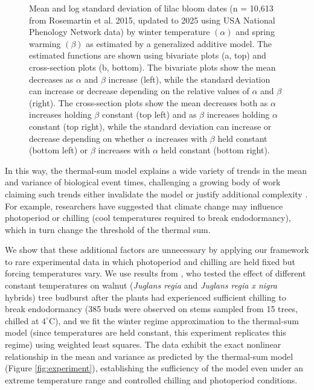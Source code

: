 \documentclass[
]{article}
\begin{document}
{\begin{figure}
     \caption{Mean and log standard deviation of lilac bloom dates (n = 10,613 from Rosemartin et al. 2015, updated to 2025 using USA National Phenology Network data) by winter temperature $(\alpha)$ and spring warming $(\beta)$ as estimated by a generalized additive model. The estimated functions are shown using bivariate plots (a, top) and cross-section plots (b, bottom). The bivariate plots show the mean decreases as $\alpha$ and $\beta$ increase (left), while the standard deviation can increase or decrease depending on the relative values of $\alpha$ and $\beta$ (right). The cross-section plots show the mean decreases both as \(\alpha\) increases holding \(\beta\) constant (top left) and as \(\beta\) increases holding \(\alpha\) constant (top right), while the standard deviation can increase or decrease depending on whether \(\alpha\) increases with \(\beta\) held constant (bottom left) or \(\beta\) increases with \(\alpha\) held constant (bottom right).}
    \label{fig:lilac_te}
\end{figure}
 
In this way, the thermal-sum model explains a wide variety of trends in the mean and variance of biological event times, challenging a growing body of work claiming such trends either invalidate the model or justify additional complexity \citep[e.g.,][]{fu2015declining,kovaleskipreprint}. For example, researchers have suggested that climate change may influence photoperiod or chilling (cool temperatures required to break endodormancy), which in turn change the threshold of the thermal sum. 

We show that these additional factors are unnecessary by applying our framework to rare experimental data in which photoperiod and chilling are held fixed but forcing temperatures vary. We use results from \cite{Charrier:2011aa}, who tested the effect of different constant temperatures on walnut (\textit{Juglans regia} and \textit{Juglans regia x nigra} hybrids) tree budburst after the plants had experienced sufficient chilling to break endodormancy (385 buds were observed on stems sampled from 15 trees, chilled at \(4^\circ\)C), and we fit the winter regime approximation to the thermal-sum model (since temperatures are held constant, this experiment replicates this regime) using weighted least squares. The data exhibit the exact nonlinear relationship in the mean and variance as predicted by the thermal-sum model (Figure \ref{fig:experiment}), establishing the sufficiency of the model even under an extreme temperature range and controlled chilling and photoperiod conditions. 

}
\end{document}
